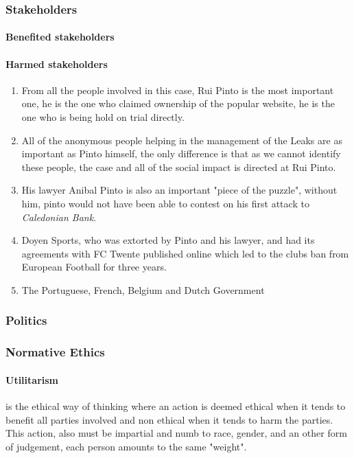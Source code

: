\subsubsection{Stakeholders}

\paragraph{Benefited stakeholders}


\paragraph{Harmed stakeholders}
    \begin{enumerate}
        \item From all the people involved in this case, Rui Pinto is the most important one, he is the one who claimed ownership of the popular website, he is the one who is being hold on trial directly.
        \item All of the anonymous people helping in the management of the Leaks are as important as Pinto himself, the only difference is that as we cannot identify these people, the case and all of the social impact is directed at Rui Pinto.
        \item His lawyer Anibal Pinto is also an important "piece of the puzzle", without him, pinto would not have been able to contest on his first attack to \textit{Caledonian Bank}.
        \item Doyen Sports, who was extorted by Pinto and his lawyer, and had its agreements with FC Twente published online which led to the clubs ban from European Football for three years.
        \item The Portuguese, French, Belgium and Dutch Government
    \end{enumerate}
\subsubsection{Politics}

\subsubsection{Normative Ethics}

\paragraph{Utilitarism}
    is the ethical way of thinking where an action is deemed ethical when it tends to benefit all parties involved and non ethical when it tends to harm the parties.
    This action, also must be impartial and numb to race, gender, and an other form of judgement, each person amounts to the same "weight".

